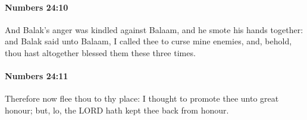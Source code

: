 		\paragraph{Numbers 24:10} %
			\label{NUMBERS-24-10}

			And Balak’s anger was kindled against Balaam, and he smote his hands together: and Balak said unto Balaam, I called thee to curse mine enemies, and, behold, thou hast altogether blessed them these three times.


		\paragraph{Numbers 24:11} %
			\label{NUMBERS-24-11}

			Therefore now flee thou to thy place: I thought to promote thee unto great honour; but, lo, the LORD hath kept thee back from honour.


